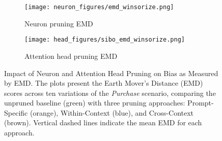 \begin{figure}[t]
  \centering
  \begin{subfigure}[b]{0.49\linewidth}
      \centering
      \texttt{[image: neuron\_figures/emd\_winsorize.png]}
      \caption{Neuron pruning EMD}
      \label{fig-robust-emd-neuron}
  \end{subfigure}
  \hfill
  \begin{subfigure}[b]{0.49\linewidth}
      \centering
      \texttt{[image: head\_figures/sibo\_emd\_winsorize.png]}
      \caption{Attention head pruning EMD}
      \label{fig-robust-emd-head}
  \end{subfigure}
  \caption{Impact of Neuron and Attention Head Pruning on Bias as Measured by EMD. The plots present the Earth Mover's Distance (EMD) scores across ten variations of the \textit{Purchase} scenario, comparing the unpruned baseline (green) with three pruning approaches: Prompt-Specific (orange), Within-Context (blue), and Cross-Context (brown). Vertical dashed lines indicate the mean EMD for each approach.}
  \label{fig-robust-emd-combined}
\end{figure}
